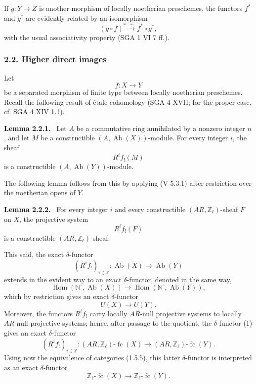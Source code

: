 \documentclass[11pt]{article}
\newenvironment{statement}[1]{\par\medskip\noindent\textbf{#1.}\ }{\par\medskip}
\DeclareMathOperator{\Hom}{Hom}
\providecommand{\Hom}{\operatorname{Hom}}
\providecommand{\Ab}{\operatorname{Ab}}
\providecommand{\fc}{\operatorname{fc}}
\providecommand{\Ab}{\operatorname{Ab}}
\begin{document}
If \(g:Y\to Z\) is another morphism of locally noetherian preschemes, the functors \(f^*\) and \(g^*\) are evidently related by an isomorphism
\[
(g\circ f)^*\xrightarrow{\sim}f^*\circ g^*,
\]
with the usual associativity property (SGA 1 VI 7 ff.).

\subsubsection*{2.2. Higher direct images}

Let
\[
f:X\longrightarrow Y
\]
be a separated morphism of finite type between locally noetherian preschemes. Recall the following result of étale cohomology (SGA 4 XVII; for the proper case, cf. SGA 4 XIV 1.1).

\begin{statement}{Lemma 2.2.1}
Let \(A\) be a commutative ring annihilated by a nonzero integer \(n\), and let \(M\) be a constructible \((A,\Ab(X))\)-module. For every integer \(i\), the sheaf
\[
R^if_!(M)
\]
is a constructible \((A,\Ab(Y))\)-module.
\end{statement}

The following lemma follows from this by applying (V 5.3.1) after restriction over the noetherian opens of \(Y\).

\begin{statement}{Lemma 2.2.2}
For every integer \(i\) and every constructible \((AR,\mathbb Z_\ell)\)-sheaf \(F\) on \(X\), the projective system
\[
R^if_!(F)
\]
is a constructible \((AR,\mathbb Z_\ell)\)-sheaf.
\end{statement}

This said, the exact \(\delta\)-functor
\[
(R^if_!)_{i\in\mathbb Z}:\Ab(X)\longrightarrow \Ab(Y)
\]
extends in the evident way to an exact \(\delta\)-functor, denoted in the same way,
\[
\Hom(\mathbb N^\circ,\Ab(X))\longrightarrow \Hom(\mathbb N^\circ,\Ab(Y)),
\]
which by restriction gives an exact \(\delta\)-functor
\[
U(X)\longrightarrow U(Y).
\tag{1}
\]
Moreover, the functors \(R^if_!\) carry locally \(AR\)-null projective systems to locally \(AR\)-null projective systems; hence, after passage to the quotient, the \(\delta\)-functor (1) gives an exact \(\delta\)-functor
\[
(R^if_!)_{i\in\mathbb Z}:(AR,\mathbb Z_\ell)\text{-}\fc(X)
\longrightarrow (AR,\mathbb Z_\ell)\text{-}\fc(Y).
\]
Using now the equivalence of categories (1.5.5), this latter \(\delta\)-functor is interpreted as an exact \(\delta\)-functor
\[
\mathbb Z_\ell\text{-}\fc(X)\longrightarrow \mathbb Z_\ell\text{-}\fc(Y).
\]
\end{document}
